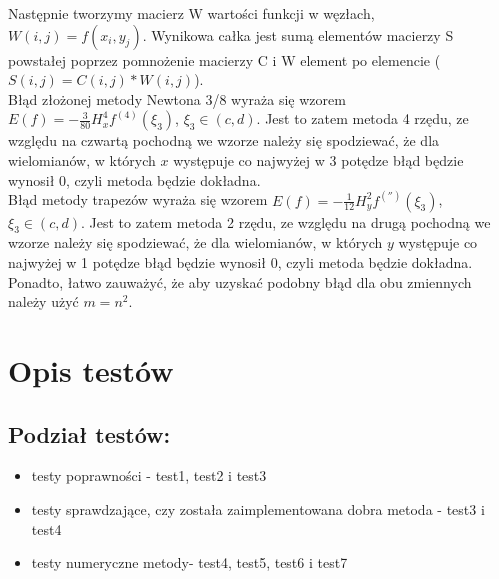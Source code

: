 \documentclass[12pt]{article}
\begin{document}
Następnie tworzymy macierz W wartości funkcji w węzłach, $W(i,j)=f(x_{i},y_{j})$.
Wynikowa całka jest sumą elementów macierzy S powstałej poprzez pomnożenie macierzy C i W element po elemencie ($S(i,j)=C(i,j)*W(i,j)$). \\
Błąd złożonej metody Newtona 3/8 wyraża się wzorem $E(f)=-\frac{3}{80}H_{x}^4f^{(4)}(\xi_{3})$, $\xi_{3}\in (c,d)$. Jest to zatem metoda 4 rzędu, ze względu na czwartą pochodną we wzorze należy się spodziewać, że dla wielomianów, w których $x$ występuje co najwyżej w 3 potędze błąd będzie wynosił 0, czyli metoda będzie dokładna.
\\
Błąd metody trapezów wyraża się wzorem $E(f)=-\frac{1}{12}H_{y}^2f^{('')}(\xi_{3})$, $\xi_{3}\in (c,d)$. Jest to zatem metoda 2 rzędu, ze względu na drugą pochodną we wzorze należy się spodziewać, że dla wielomianów, w których $y$ występuje co najwyżej w 1 potędze błąd będzie wynosił 0, czyli metoda będzie dokładna.
\\
Ponadto, łatwo zauważyć, że aby uzyskać podobny błąd dla obu zmiennych należy użyć $m=n^2$.
\section{Opis testów}
\subsection{Podział testów:}
\begin{itemize}
\item{testy poprawności - test1, test2 i test3}
\item{testy sprawdzające, czy została zaimplementowana dobra metoda - test3 i test4}
\item{testy numeryczne metody- test4, test5, test6 i test7}
\end{itemize}
\end{document}
